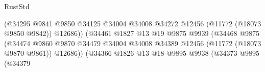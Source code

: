 \begin{lexlean}{RustStd}
\begin{coremodule}
                                                              (@34295
                                                                @9841
                                                                @9850
                                                                @34125
                                                                @34004
                                                                @34008
                                                                @34272
                                                                @12456
                                                                (@11772 (@18073 @9850 @9842))
                                                                @12686))
                                                            (@34461
                                                              @1827
                                                              @13
                                                              @19
                                                              @9875
                                                              @9939
                                                              (@34468
                                                                @9875
                                                                (@34474
                                                                  @9860
                                                                  @9870
                                                                  @34479
                                                                  @34004
                                                                  @34008
                                                                  @34389
                                                                  @12456
                                                                  (@11772 (@18073 @9870 @9861))
                                                                  @12686))
                                                              (@34366
                                                                @1826
                                                                @13
                                                                @18
                                                                @9895
                                                                @9938
                                                                (@34373
                                                                  @9895
                                                                  (@34379

\end{coremodule}
\end{lexlean}
